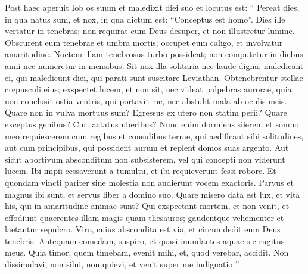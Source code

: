 \begin{biblechapter}
\begin{biblechapter}
\begin{biblechapter}
\verse Post haec aperuit Iob os suum et maledixit diei suo 
\verse et locutus est:
 \verse “ Pereat dies, in qua natus sum,
 et nox, in qua dictum est: “Conceptus est homo”.
 \verse Dies ille vertatur in tenebras;
 non requirat eum Deus desuper,
 et non illustretur lumine.
 \verse Obscurent eum tenebrae et umbra mortis;
 occupet eum caligo,
 et involvatur amaritudine.
 \verse Noctem illam tenebrosus turbo possideat;
 non computetur in diebus anni
 nec numeretur in mensibus.
 \verse Sit nox illa solitaria nec laude digna;
 \verse maledicant ei, qui maledicunt diei,
 qui parati sunt suscitare Leviathan.
 \verse Obtenebrentur stellae crepusculi eius;
 exspectet lucem, et non sit,
 nec videat palpebras aurorae,
 \verse quia non conclusit ostia ventris, qui portavit me,
 nec abstulit mala ab oculis meis.
 \verse Quare non in vulva mortuus sum?
 Egressus ex utero non statim perii? 
\verse Quare exceptus genibus?
 Cur lactatus uberibus?
 \verse Nunc enim dormiens silerem
 et somno meo requiescerem
 \verse cum regibus et consulibus terrae,
 qui aedificant sibi solitudines,
 \verse aut cum principibus, qui possident aurum
 et replent domos suas argento.
 \verse Aut sicut abortivum absconditum non subsisterem,
 vel qui concepti non viderunt lucem.
 \verse Ibi impii cessaverunt a tumultu,
 et ibi requieverunt fessi robore.
 \verse Et quondam vincti pariter sine molestia
 non audierunt vocem exactoris.
 \verse Parvus et magnus ibi sunt,
 et servus liber a domino suo.
 \verse Quare misero data est lux,
 et vita his, qui in amaritudine animae sunt?
 \verse Qui exspectant mortem, et non venit,
 et effodiunt quaerentes illam magis quam thesauros;
 \verse gaudentque vehementer
 et laetantur sepulcro.
 \verse Viro, cuius abscondita est via,
 et circumdedit eum Deus tenebris. 
\verse Antequam comedam, suspiro,
 et quasi inundantes aquae sic rugitus meus.
 \verse Quia timor, quem timebam, evenit mihi,
 et, quod verebar, accidit.
 \verse Non dissimulavi, non silui, non quievi,
 et venit super me indignatio ”.
 

\end{biblechapter}
\end{biblechapter}
\end{biblechapter}
